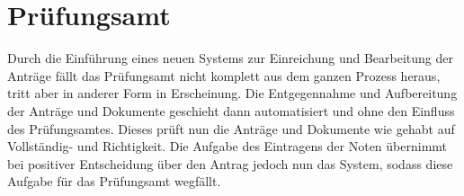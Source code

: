 \section*{Prüfungsamt}

Durch die Einführung eines neuen Systems zur Einreichung und Bearbeitung der Anträge fällt das Prüfungsamt nicht komplett aus dem ganzen Prozess heraus, tritt aber in anderer Form in Erscheinung. Die Entgegennahme und Aufbereitung der Anträge und Dokumente geschieht dann automatisiert und ohne den Einfluss des Prüfungsamtes. Dieses prüft nun die Anträge und Dokumente wie gehabt auf Vollständig- und Richtigkeit. Die Aufgabe des Eintragens der Noten übernimmt bei positiver Entscheidung über den Antrag jedoch nun das System, sodass diese Aufgabe für das Prüfungsamt wegfällt.